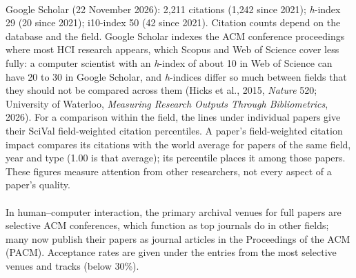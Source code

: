 \documentclass[11pt]{article}
\begin{document}
\sectionbreak
{}
\\
Google Scholar (22 November 2026): 2{,}211 citations (1{,}242 since 2021); \emph{h}-index 29 (20 since 2021); i10-index 50 (42 since 2021).
\ifAPR
Citation counts depend on the database and the field. Google Scholar indexes the ACM conference proceedings where most HCI research appears, which Scopus and Web of Science cover less fully: a computer scientist with an \emph{h}-index of about 10 in Web of Science can have 20 to 30 in Google Scholar, and \emph{h}-indices differ so much between fields that they should not be compared across them (Hicks et al., 2015, \emph{Nature} 520; University of Waterloo, \emph{Measuring Research Outputs Through Bibliometrics}, 2026). For a comparison within the field, the lines under individual papers give their SciVal field-weighted citation percentiles. A paper's field-weighted citation impact compares its citations with the world average for papers of the same field, year and type (1.00 is that average); its percentile places it among those papers. These figures measure attention from other researchers, not every aspect of a paper's quality.
\fi
\\ \\

\ifAPR\else
In human--computer interaction, the primary archival venues for full papers are selective ACM conferences, which function as top journals do in other fields; many now publish their papers as journal articles in the Proceedings of the ACM (PACM). Acceptance rates are given under the entries from the most selective venues and tracks (below 30\%).
\fi

\begin{cvparts}

    \nocite{*}


    \keepwithnext

    \keepwithnext


    \keepwithnext

    \keepwithnext


    \keepwithnext

    \sloppy
    \keepwithnext

\end{cvparts}
\end{document}
